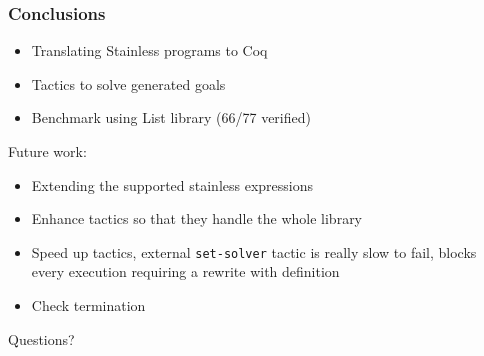 \documentclass{beamer}
\newcommand{\coqInline}[1]{\lstinline[style=myCoqStyle]|#1|}
\begin{document}
\begin{frame}
	\frametitle{Conclusions}
	\begin{itemize}
		\item Translating Stainless programs to Coq
		\item Tactics to solve generated goals
		\item Benchmark using List library  (66/77 verified)
	\end{itemize}
	
	 {
		Future work: 
		\begin{itemize}
			\item Extending the supported stainless expressions
			\item Enhance tactics so that they handle the whole library
			\item Speed up tactics, external \coqInline{set-solver} tactic is really slow to fail, blocks every execution requiring a rewrite with definition
			\item Check termination
		\end{itemize}
		
	}
\end{frame}



\begin{frame}
	\Huge{\centerline{Questions?}}
\end{frame}
\end{document}
